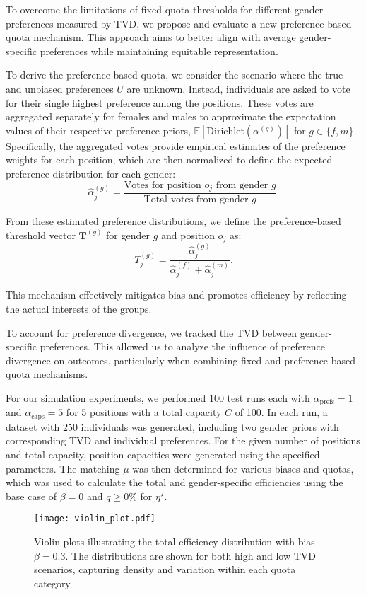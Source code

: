 \documentclass[letterpaper]{article}
\begin{document}
To overcome the limitations of fixed quota thresholds for different gender preferences measured by TVD, we propose and evaluate a new preference-based quota mechanism. This approach aims to better align with average gender-specific preferences while maintaining equitable representation.

To derive the preference-based quota, we consider the scenario where the true and unbiased preferences \( U \) are unknown. Instead, individuals are asked to vote for their single highest preference among the positions. These votes are aggregated separately for females and males to approximate the expectation values of their respective preference priors, \( \mathbb{E}[\textrm{Dirichlet}(\alpha^{(g)})] \) for \( g \in \{f, m\} \). Specifically, the aggregated votes provide empirical estimates of the preference weights for each position, which are then normalized to define the expected preference distribution for each gender:
\[
\hat{\alpha}^{(g)}_j = \frac{\text{Votes for position } o_j \text{ from gender } g}{\text{Total votes from gender } g}.
\]

From these estimated preference distributions, we define the preference-based threshold vector \( \mathbf{T}^{(g)} \) for gender \( g \) and position \( o_j \) as:
\[
T_j^{(g)} = \frac{\hat{\alpha}^{(g)}_j}{\hat{\alpha}^{(f)}_j + \hat{\alpha}^{(m)}_j}.
\]

This mechanism effectively mitigates bias and promotes efficiency by reflecting the actual interests of the groups.

To account for preference divergence, we tracked the TVD between gender-specific preferences. This allowed us to analyze the influence of preference divergence on outcomes, particularly when combining fixed and preference-based quota mechanisms.


For our simulation experiments, we performed 100 test runs each with \( \alpha_\text{prefs} = 1 \) and \( \alpha_\text{caps} = 5 \) for 5 positions with a total capacity \( C \) of 100. In each run, a dataset with 250 individuals was generated, including two gender priors with corresponding TVD and individual preferences. For the given number of positions and total capacity, position capacities were generated using the specified parameters. The matching \( \mu \) was then determined for various biases and quotas, which was used to calculate the total and gender-specific efficiencies using the base case of \( \beta = 0 \) and \( q \geq 0\% \) for \(\eta^{\star}\). 

\begin{figure}[ht]

  \centering
  \texttt{[image: violin\_plot.pdf]}
\caption{Violin plots illustrating the total efficiency distribution with bias \( \beta = 0.3 \). The distributions are shown for both high and low TVD scenarios, capturing density and variation within each quota category.}

  \label{fig:violin_plot}
\end{figure}
\end{document}
